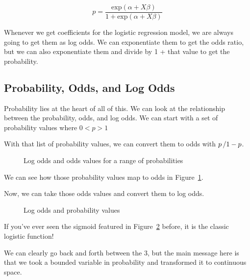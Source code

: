 \documentclass[
  letterpaper,
]{krantz}
\begin{document}
\[p = \frac{\textrm{exp}(\alpha + X\beta)}{1 + \textrm{exp}(\alpha + X\beta)}\]

Whenever we get coefficients for the logistic regression model, we are
always going to get them as log odds. We can exponentiate them to get
the odds ratio, but we can also exponentiate them and divide by 1 + that
value to get the probability.

\subsection{Probability, Odds, and Log
Odds}\label{sec-glm-binomial-prob}

Probability lies at the heart of all of this. We can look at the
relationship between the probability, odds, and log odds. We can start
with a set of probability values where \(0 < p > 1\)

With that list of probability values, we can convert them to odds with
\(\\p\, / 1 - p\).

\begin{figure}[H]


\caption{\label{fig-odds-log-odds}Log odds and odds values for a range
of probabilities}

\end{figure}%

We can see how those probability values map to odds in
Figure~\ref{fig-odds-log-odds}.

Now, we can take those odds values and convert them to log odds.

\begin{figure}[H]


\caption{\label{fig-prob-log-odds}Log odds and probability values}

\end{figure}%

If you've ever seen the sigmoid featured in
Figure~\ref{fig-prob-log-odds} before, it is the classic logistic
function!

We can clearly go back and forth between the 3, but the main message
here is that we took a bounded variable in probability and transformed
it to continuous space.
\end{document}
